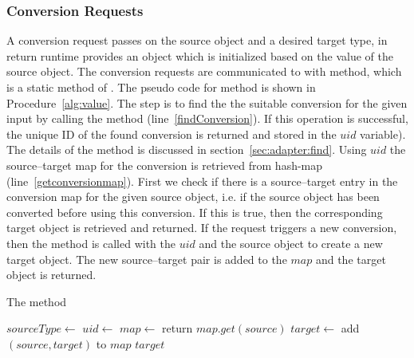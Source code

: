 \subsubsection{\zamk Conversion Requests}
\label{sec:adapter:convreq}
A conversion request passes on the source object and a desired target type, in return \zamk runtime provides an object which is initialized based on the value of the source object.
The conversion requests are communicated to \zamk with  method, which is a static method of .
The pseudo code for  method is shown in Procedure~\ref{alg:value}. 
The step is to find the the suitable conversion for the given input by calling the  method (line~\ref{findConversion}).
 If this operation is successful, the unique ID of the found conversion is returned and stored in the $uid$ variable). The details of the  method is discussed in section~\ref{sec:adapter:find}. 
Using $uid$ the source--target map for the conversion is retrieved from  hash-map (line~\ref{getconversionmap}).
First we check if there is a source--target entry in the conversion map for the given source object, i.e. if the source object has been converted before using this conversion. 
If this is true, then the corresponding target object is retrieved and returned.
If the request triggers a new conversion, then the  method is called with the $uid$ and the source object to create a new target object. 
The new source--target pair is added to the $map$ and the target object is returned.


\begin{algorithm}
\caption{The  method}\label{alg:value}
	\begin{algorithmic}[1]
		\State $sourceType \gets$ 
		\State $uid \gets$  \label{findConversion}
		\State $map \gets$  \label{getconversionmap}
			\State return $map.get(source)$ \label{existingconversion}
		\Else
			\State $target \gets$  \label{newconversion}
			\State add $(source, target)$ to $map$ \label{addtomap}
			\State \Return $target$
		\EndIf
		\EndProcedure
	\end{algorithmic}
\end{algorithm}

